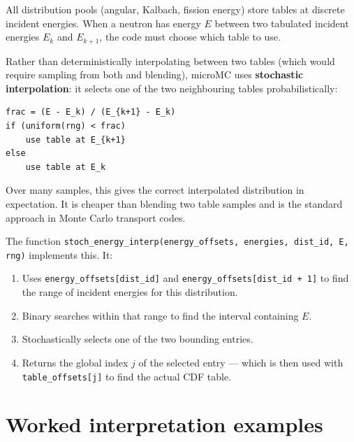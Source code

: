 \documentclass[11pt,a4paper]{article}
\begin{document}
All distribution pools (angular, Kalbach, fission energy) store tables at discrete incident energies. When a neutron has energy $E$ between two tabulated incident energies $E_k$ and $E_{k+1}$, the code must choose which table to use.

Rather than deterministically interpolating between two tables (which would require sampling from both and blending), microMC uses \textbf{stochastic interpolation}: it selects one of the two neighbouring tables probabilistically:

\begin{lstlisting}
frac = (E - E_k) / (E_{k+1} - E_k)
if (uniform(rng) < frac)
    use table at E_{k+1}
else
    use table at E_k
\end{lstlisting}

Over many samples, this gives the correct interpolated distribution in expectation. It is cheaper than blending two table samples and is the standard approach in Monte Carlo transport codes.

The function \texttt{stoch\_energy\_interp(energy\_offsets, energies, dist\_id, E, rng)} implements this. It:
\begin{enumerate}[leftmargin=1.4em]
  \item Uses \texttt{energy\_offsets[dist\_id]} and \texttt{energy\_offsets[dist\_id + 1]} to find the range of incident energies for this distribution.
  \item Binary searches within that range to find the interval containing $E$.
  \item Stochastically selects one of the two bounding entries.
  \item Returns the global index $j$ of the selected entry --- which is then used with \texttt{table\_offsets[j]} to find the actual CDF table.
\end{enumerate}

\section{Worked interpretation examples}
\end{document}
